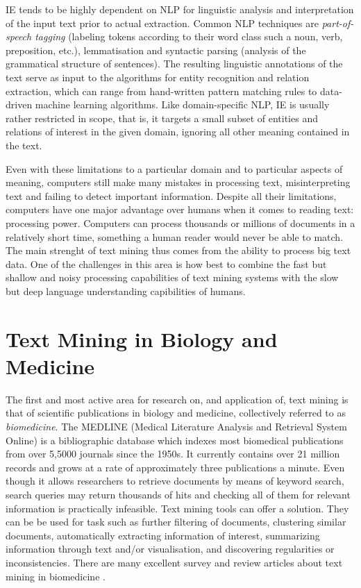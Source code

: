 \documentclass[11pt,oneside,a4paper]{report}
\newcommand{\EM}[1]{\todo[inline,author=EM,color=yellow]{#1}}
\begin{document}
IE tends to be highly dependent on NLP for linguistic analysis and interpretation of the input text prior to actual extraction.
Common NLP techniques are \emph{part-of-speech tagging} (labeling tokens according to their word class such a noun, verb, preposition, etc.), lemmatisation and syntactic parsing (analysis of the grammatical structure of sentences).
The resulting linguistic annotations of the text serve as input to the algorithms for entity recognition and relation extraction, which can range from hand-written pattern matching rules to data-driven machine learning algorithms.
Like domain-specific NLP, IE is usually rather restricted in scope, that is, it targets a small subset of entities and relations of interest in the given domain, ignoring all other meaning contained in the text.    

Even with these limitations to a particular domain and to particular aspects of meaning, computers still make many mistakes in processing text, misinterpreting text and failing to detect important information.
Despite all their limitations, computers have one major advantage over humans when it comes to reading text: processing power. 
Computers can process thousands or millions of documents in a relatively short time, something a human reader would never be able to match.
The main strenght of text mining thus comes from the ability to process big text data.
One of the challenges in this area is how best to combine the fast but shallow and noisy processing capabilities of text mining systems with the slow but deep language understanding capibilities of humans.

\section{Text Mining in Biology and Medicine}

The first and most active area for research on, and application of, text mining is that of scientific publications in biology and medicine, collectively referred to as \emph{biomedicine}.
The MEDLINE (Medical Literature Analysis and Retrieval System Online) is a bibliographic database which indexes most biomedical publications from over 5,5000 journals since the 1950s.  
It currently contains over 21 million records and grows at a rate of approximately three publications a minute.\EM{ref}
Even though it allows researchers to retrieve documents by means of keyword search, search queries may return thousands of hits and checking all of them for relevant information is practically infeasible.
Text mining tools can offer a solution.
They can be be used for task such as further filtering of documents, clustering similar documents, automatically extracting information of interest, summarizing information through text and/or visualisation, and discovering regularities or inconsistencies.
There are many excellent survey and review articles about text mining in biomedicine 
\citep{Neves2012Survey,Simpson2012Biomedical,Andronis2011Literature,Ananiadou2010Event,RodriguezEsteban2009Biomedical,Zweigenbaum2009Advanced,Cohen2008Getting,Zweigenbaum2007Frontiers,Ananiadou2006,Erhardt2006Status,JenEA06,Spasic2005Text,Cohen2005Survey,Krauthammer2004Term}.
\end{document}
